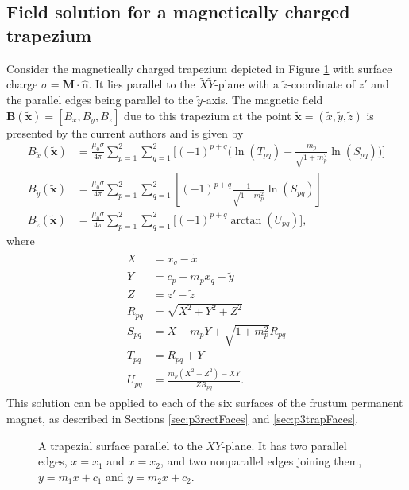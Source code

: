 \subsection{Field solution for a magnetically charged trapezium}
Consider the magnetically charged trapezium depicted in Figure \ref{fig:p3trapezium} with surface charge \(\sigma = \mathbf{M} \cdot \hat{\mathbf{n}}\). It lies parallel to the \(\tilde{X}\tilde{Y}\)-plane with a \(\tilde{z}\)-coordinate of \(z'\) and the parallel edges being parallel to the \(\tilde{y}\)-axis. The magnetic field \(\mathbf{B}\left(\tilde{\mathbf{x}}\right) = \left[ B_{x}, B_{y}, B_{z} \right]\) due to this trapezium at the point \(\tilde{\mathbf{x}} = \left(\tilde{x}, \tilde{y}, \tilde{z}\right)\) is presented by the current authors \cite{OConnell2020a} and is given by
\begin{align}\label{eqn:p3fieldequation}
B_{\tilde{x}}\left(\tilde{\mathbf{x}}\right) &= \frac{\mu_0 \sigma}{4\pi} \sum_{p=1}^2 \sum_{q=1}^2 \Bigg[ \left( -1 \right) ^{p+q} \Bigg( \ln \left( T_{pq} \right) - \frac{m_p}{\sqrt{1+m_p^2}} \ln \left(S_{pq}\right) \Bigg) \Bigg] \nonumber \\
B_{\tilde{y}}\left(\tilde{\mathbf{x}}\right) &= \frac{\mu_0 \sigma}{4\pi} \sum_{p=1}^2 \sum_{q=1}^2 \left[ \left( -1 \right)^{p+q} \frac{1}{\sqrt{1+m_p^2}} \ln \left( S_{pq} \right) \right] \\
B_{\tilde{z}}\left(\tilde{\mathbf{x}}\right) &= \frac{\mu_0 \sigma}{4\pi} \sum_{p=1}^2 \sum_{q=1}^2 \Bigg[ \left( -1 \right) ^{p+q} \arctan \left( U_{pq} \right) \Bigg] \text{,} \nonumber
\end{align}
where
\begin{align}\label{eqn:p3intermediatevars}
\begin{split}
X &= x_q - \tilde{x} \\
Y &= c_p + m_px_q - \tilde{y} \\
Z &= z' - \tilde{z} \\
R_{pq} &= \sqrt{X^2 + Y^2 + Z^2} \\
S_{pq} &= X + m_pY + \sqrt{1+m_p^2}R_{pq} \\
T_{pq} &= R_{pq} + Y \\
U_{pq} &= \frac{m_p\left(X^2+Z^2\right)-XY}{ZR_{pq}} \text{.}
\end{split}
\end{align}
This solution can be applied to each of the six surfaces of the frustum permanent magnet, as described in Sections \ref{sec:p3rectFaces} and \ref{sec:p3trapFaces}.
\begin{figure}
	\centering
	
	\caption{A trapezial surface parallel to the \(XY\)-plane. It has two parallel edges, \(x = x_1\) and \(x = x_2\), and two nonparallel edges joining them, \(y = m_1x+c_1\) and \(y = m_2x+c_2\).}
	\label{fig:p3trapezium}
\end{figure}

